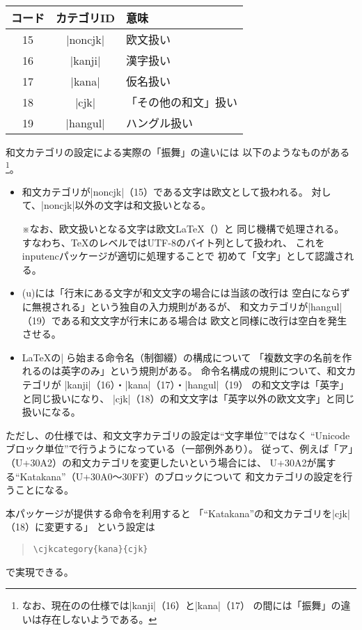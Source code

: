 \documentclass[uplatex,dvipdfmx,a4paper]{jsarticle}
\newcommand{\Pkg}[1]{\textsf{#1}}
\newcommand{\Note}{\par\noindent ※}
\begin{document}
\begin{center}\small\begin{tabular}{ccl}
  \hline
  コード & カテゴリID & 意味 \\
  \hline
  15 & |noncjk| & 欧文扱い \\
  16 & |kanji|  & 漢字扱い \\
  17 & |kana|   & 仮名扱い \\
  18 & |cjk|    & 「その他の和文」扱い \\
  19 & |hangul| & ハングル扱い \\
  \hline
\end{tabular}\end{center}
和文カテゴリの設定による実際の「振舞」の違いには
以下のようなものがある
\footnote{なお、現在の{\upTeX}の仕様では|kanji|（16）と|kana|（17）
  の間には「振舞」の違いは存在しないようである。}。
\begin{itemize}
\item 和文カテゴリが|noncjk|（15）である文字は欧文として扱われる。
  対して、|noncjk|以外の文字は和文扱いとなる。
  \Note なお、欧文扱いとなる文字は欧文{\LaTeX}（{\pdfLaTeX}）と
  同じ機構で処理される。
  すなわち、{\TeX}のレベルではUTF-8のバイト列として扱われ、
  これを\Pkg{inputenc}パッケージが適切に処理することで
  初めて「文字」として認識される。
\item (u){\pLaTeX}には「行末にある文字が和文文字の場合には当該の改行は
  空白にならずに無視される」という独自の入力規則があるが、
  和文カテゴリが|hangul|（19）である和文文字が行末にある場合は
  欧文と同様に改行は空白を発生させる。
\item {\LaTeX}の|\|から始まる命令名（制御綴）の構成について
  「複数文字の名前を作れるのは英字のみ」という規則がある。
  命令名構成の規則について、和文カテゴリが
  |kanji|（16）・|kana|（17）・|hangul|（19）
  の和文文字は「英字」と同じ扱いになり、
  |cjk|（18）の和文文字は「英字以外の欧文文字」と同じ扱いになる。
\end{itemize}

ただし、{\upTeX}の仕様では、和文文字カテゴリの設定は“文字単位”ではなく
“Unicodeブロック単位”で行うようになっている（一部例外あり）。
従って、例えば「ア」（U+30A2）の和文カテゴリを変更したいという場合には、
U+30A2が属する“Katakana”（U+30A0～30FF）のブロックについて
和文カテゴリの設定を行うことになる。

本パッケージが提供する命令を利用すると
「“Katakana”の和文カテゴリを|cjk|（18）に変更する」
という設定は
\begin{quote}\small
\begin{verbatim}
\cjkcategory{kana}{cjk}
\end{verbatim}
\end{quote}
で実現できる。
\end{document}

